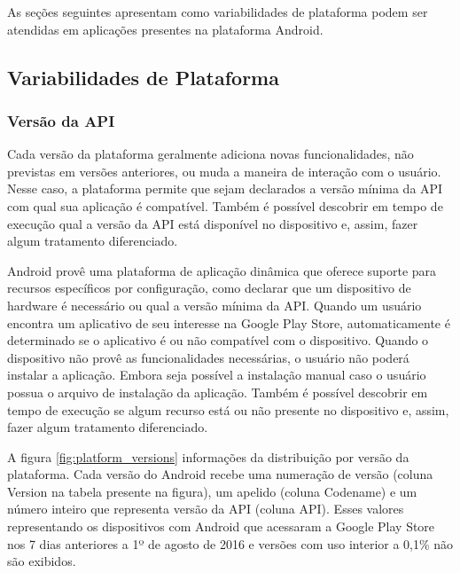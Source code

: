 As seções seguintes apresentam como variabilidades de plataforma podem ser atendidas
em aplicações presentes na plataforma Android.

\subsection{Variabilidades de Plataforma}

\subsubsection{Versão da API}

Cada versão da plataforma geralmente adiciona novas funcionalidades, não previstas
em versões anteriores, ou muda a maneira de interação com o usuário. Nesse caso,
a plataforma permite que sejam declarados a versão mínima da API com qual sua
aplicação é compatível. Também é possível descobrir em tempo de execução qual a
versão da API está disponível no dispositivo e, assim, fazer algum tratamento diferenciado.

Android provê uma plataforma de aplicação dinâmica que oferece suporte para recursos
específicos por configuração, como declarar que um dispositivo de hardware é necessário
ou qual a versão mínima da API. Quando um usuário encontra um aplicativo de seu interesse
na Google Play Store, automaticamente é determinado se o aplicativo é ou não compatível
com o dispositivo. Quando o dispositivo não provê as funcionalidades necessárias,
o usuário não poderá instalar a aplicação. Embora seja possível a instalação manual
caso o usuário possua o arquivo de instalação da aplicação. Também é possível descobrir
em tempo de execução se algum recurso está ou não presente no dispositivo e, assim,
fazer algum tratamento diferenciado.

A figura \ref{fig:platform_versions} informações da distribuição por versão da plataforma.
Cada versão do Android recebe uma numeração de versão (coluna Version na tabela
presente na figura), um apelido (coluna Codename) e um número inteiro que representa
versão da API (coluna API). Esses valores representando os dispositivos com Android
que acessaram a Google Play Store nos 7 dias anteriores a 1º de agosto de 2016 e
versões com uso interior a 0,1\% não são exibidos. 

